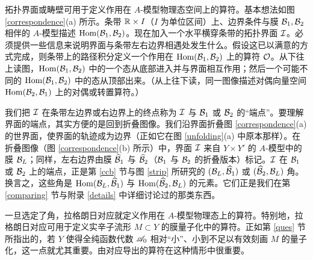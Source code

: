 拓扑界面或畴壁可用于定义作用在 $A$-模型物理态空间上的算符。基本想法如图 \ref{correspondence}(a) 所示。条带 ${\mathbb R}\times I$（$I$ 为单位区间）上、边界条件与膜 ${\mathcal B}_1,{\mathcal B}_2$ 相伴的 $A$-模型描述 ${\mathrm{Hom}}({\mathcal B}_1,{\mathcal B}_2)$。现在加入一个水平横穿条带的拓扑界面 ${\mathcal I}$。必须提供一些信息来说明界面与条带左右边界相遇处发生什么。假设这已以满意的方式完成，则条带上的路径积分定义一个作用在 ${\mathrm{Hom}}({\mathcal B}_1,{\mathcal B}_2)$ 上的算符 ${\mathcal O}$。从下往上读图，${\mathrm{Hom}}({\mathcal B}_1,{\mathcal B}_2)$ 中的一个态从底部进入并与界面相互作用；然后一个可能不同的 ${\mathrm{Hom}}({\mathcal B}_1,{\mathcal B}_2)$ 中的态从顶部出来。（从上往下读，同一图像描述对偶向量空间 ${\mathrm{Hom}}({\mathcal B}_2,{\mathcal B}_1)$ 上的对偶或转置算符。）

我们把 ${\mathcal I}$ 在条带左边界或右边界上的终点称为 ${\mathcal I}$ 与 ${\mathcal B}_1$ 或 ${\mathcal B}_2$ 的“端点”。要理解界面的端点，其实方便的是回到折叠图像。我们沿界面折叠图 \ref{correspondence}(a) 的世界面，使界面的轨迹成为边界（正如它在图 \ref{unfolding}(a) 中原本那样）。在折叠图像（图 \ref{correspondence}(b) 所示）中，界面 ${\mathcal I}$ 来自 $Y\times Y'$ 的 $A$-模型中的膜 ${\mathcal B}_L$；同样，左右边界由膜 $\widehat{{\mathcal B}}_1$ 与 $\widehat{{\mathcal B}}_2$（${\mathcal B}_1$ 与 ${\mathcal B}_2$ 的折叠版本）标记。${\mathcal I}$ 在 ${\mathcal B}_1$ 或 ${\mathcal B}_2$ 上的端点，正是第 \ref{ccb} 节与图 \ref{strip} 所研究的 $({\mathcal B}_L,\widehat{{\mathcal B}}_1)$ 或 $(\widehat{{\mathcal B}}_2,{\mathcal B}_L)$ 角。换言之，这些角是 ${\mathrm{Hom}}({\mathcal B}_L,\widehat{{\mathcal B}}_1)$ 与 ${\mathrm{Hom}}(\widehat{{\mathcal B}}_2,{\mathcal B}_L)$ 的元素。它们正是我们在第 \ref{comparing} 节与附录 \ref{details} 中详细讨论过的那类东西。

一旦选定了角，拉格朗日对应就定义作用在 $A$-模型物理态上的算符。特别地，拉格朗日对应可用于定义实辛子流形 $M\subset Y$ 的膜量子化中的算符。正如第 \ref{ques} 节所指出的，若 $Y$ 使得全纯函数代数 ${\mathscr A}_0$ 相对“小”、小到不足以有效刻画 $M$ 的量子化，这一点就尤其重要。由对应导出的算符在这种情形中很重要。
